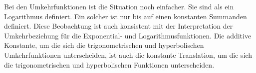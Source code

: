 Bei den Umkehrfunktionen ist die Situation noch einfacher.
Sie sind als ein Logarithmus definiert.
Ein solcher ist nur bis auf einen konstanten Summanden definiert.
Diese Beobachtung ist auch konsistent mit der Interpretation der
Umkehrbeziehung für die Exponential- und Logarithmusfunktionen.
Die additive Konstante, um die sich die trigonometrischen und
hyperbolischen Umkehrfunktionen unterscheiden, ist auch die konstante
Translation, um die sich die trigonometrischen und hyperbolischen
Funktionen unterscheiden.
